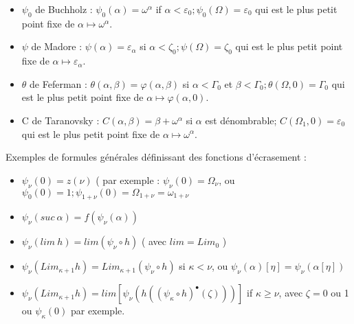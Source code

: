 \documentclass[12pt]{beamer}
\begin{document}
\begin{frame}
\begin{itemize}
\item \( \psi_0 \) de Buchholz : \( \psi_0(\alpha) = \omega^\alpha \) if \( \alpha < \varepsilon_0 ; \psi_0(\Omega) = \varepsilon_0 \) qui est le plus petit point fixe de \( \alpha \mapsto \omega^\alpha \).
\vspace{-0.1cm}

\item \(\psi\) de Madore : \(\psi(\alpha) = \varepsilon_\alpha \) si \(\alpha < \zeta_0 ; \psi(\Omega) = \zeta_0 \) qui est le plus petit point fixe de \( \alpha \mapsto \varepsilon_\alpha \).
\vspace{-0.1cm}

\item \(\theta\) de Feferman : \(\theta(\alpha,\beta) = \varphi(\alpha,\beta) \) si \( \alpha < \Gamma_0 \) et \( \beta < \Gamma_0 ; \theta(\Omega,0) = \Gamma_0 \) qui est le plus petit point fixe de \( \alpha \mapsto \varphi(\alpha,0) \).
\vspace{-0.1cm}

\item C de Taranovsky : \( C(\alpha,\beta) = \beta+\omega^\alpha \) si \( \alpha \) est dénombrable; \( C(\Omega_1,0) = \varepsilon_0 \) qui est le plus petit point fixe de \( \alpha \mapsto \omega^\alpha \).

\end{itemize}

\end{frame}
\begin{frame}

Exemples de formules générales définissant des fonctions d'écrasement :

\begin{itemize}
     \setlength{\itemsep}{1pt}
     \setlength{\parskip}{0pt}
     \setlength{\parsep}{0pt}

\item \( \psi_\nu(0) = z(\nu) \) ( par exemple : \( \psi_\nu(0) = \Omega_\nu \), ou \( \psi_0(0) = 1; \psi_{1+\nu}(0) = \Omega_{1+\nu} = \omega_{1+\nu} \) 

\item \( \psi_\nu(suc\ \alpha) = f(\psi_\nu(\alpha)) \) 

\item \( \psi_\nu(lim\ h) = lim(\psi_\nu \circ h) \) ( avec \( lim = Lim_0 \) )

\item \( \psi_\nu(Lim_{\kappa+1} h) = Lim_{\kappa+1}(\psi_\nu \circ h) \) si \( \kappa < \nu \), 
 ou \( \psi_\nu(\alpha)[\eta] = \psi_\nu(\alpha[\eta]) \)

\item \( \psi_\nu (Lim_{\kappa+1} h) = lim [ \psi_\nu (h ((\psi_\kappa \circ h)^\bullet (\zeta)))] \) if \( \kappa \ge \nu \), avec \( \zeta = 0 \) ou 1 ou \( \psi_\kappa(0) \) par exemple.

\end{itemize}

\end{frame}
\end{document}
